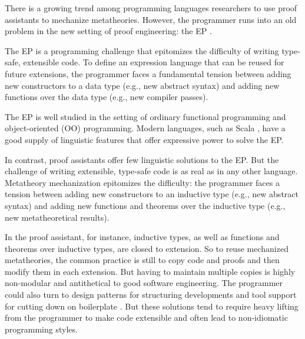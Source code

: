 
There is a growing trend among programming languages researchers
to use proof assistants to mechanize meta\-theories.
%
However, the programmer runs into an old problem
in the new setting of proof engineering:
the \ac{EP} \cite{wadler-ep}.

The EP is a programming challenge that
epitomizes the difficulty of writing type-safe, extensible code.
To define an expression language that can be reused for future extensions,
the programmer faces a fundamental tension \cite{reynolds1975} between
adding new constructors to a data type (e.g., new abstract syntax) and
adding new functions over the data type (e.g., new compiler passes).

The EP is well studied in the setting of ordinary functional
programming and object-oriented (OO) programming.
Modern languages, such as Scala \cite{scala-oopsla05}, have a good
supply of linguistic features that offer expressive power to solve the
EP. %

In contrast, proof assistants offer few linguistic solutions to the EP.
But the challenge of writing extensible, type-safe code is
as real as in any other language.
Metatheory mechanization epitomizes the difficulty:
the programmer faces a tension between adding new constructors to an inductive type
(e.g., new abstract syntax) and adding new functions and theorems over
the inductive type (e.g., new meta\-theoretical results).

In the \citeauthor{coq} proof assistant, for instance, inductive types, as well as functions and
theorems over inductive types, are closed to extension.
So to reuse mechanized metatheories,
the common practice is still to copy code and proofs and then modify them in each extension.
But having to maintain multiple copies is highly non-modular and
antithetical to good software engineering.
%
The programmer could also turn to design patterns for structuring developments
and tool support for cutting down on boilerplate
\cite{delaware2011,delaware2013,schwaab2013modular,keuchel2013generic,forsta2020}.
But these solutions tend to require heavy lifting from the programmer to make code
extensible and often lead to non-idiomatic programming styles.

